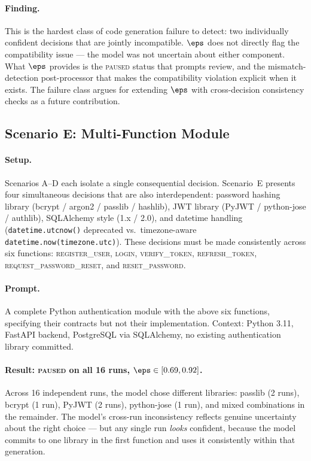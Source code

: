 \paragraph{Finding.}
This is the hardest class of code generation failure to detect: two
individually confident decisions that are jointly incompatible.
$\eps$ does not directly flag the compatibility issue --- the model was
not uncertain about either component. What $\eps$ provides is the
\textsc{paused} status that prompts review, and the mismatch-detection
post-processor that makes the compatibility violation explicit when it
exists. The failure class argues for extending $\eps$ with cross-decision
consistency checks as a future contribution.

\subsection{Scenario E: Multi-Function Module}
\label{sec:eval-e}

\paragraph{Setup.}
Scenarios A--D each isolate a single consequential decision. Scenario~E
presents four simultaneous decisions that are also interdependent: password
hashing library (bcrypt / argon2 / passlib / hashlib), JWT library (PyJWT
/ python-jose / authlib), SQLAlchemy style (1.x / 2.0), and datetime
handling (\texttt{datetime.utcnow()} deprecated vs.\ timezone-aware
\texttt{datetime.now(timezone.utc)}). These decisions must be made
consistently across six functions: \textsc{register\_user}, \textsc{login},
\textsc{verify\_token}, \textsc{refresh\_token},
\textsc{request\_password\_reset}, and \textsc{reset\_password}.

\paragraph{Prompt.}
A complete Python authentication module with the above six functions,
specifying their contracts but not their implementation. Context: Python
3.11, FastAPI backend, PostgreSQL via SQLAlchemy, no existing authentication
library committed.

\paragraph{Result: \textsc{paused} on all 16 runs, $\eps \in [0.69, 0.92]$.}
Across 16 independent runs, the model chose different libraries: passlib
(2 runs), bcrypt (1 run), PyJWT (2 runs), python-jose (1 run), and mixed
combinations in the remainder. The model's cross-run inconsistency reflects
genuine uncertainty about the right choice --- but any single run \emph{looks}
confident, because the model commits to one library in the first function
and uses it consistently within that generation.

